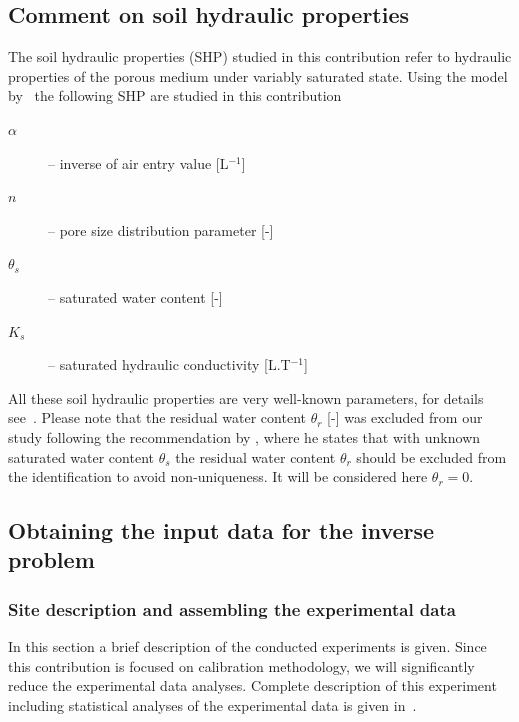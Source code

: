 \documentclass[review,times,3p,10pt]{elsarticle}
\begin{document}
{\subsection{Comment on soil hydraulic properties}
\label{shpdescr}

 The soil hydraulic properties (SHP) studied in this contribution refer to hydraulic properties of the porous medium under variably saturated state. Using the model by~\cite{vangenuchten} the following SHP are studied in this contribution
\begin{description}
\item[$\alpha$] -- inverse of air entry value [L$^{-1}$]
\item[$n$] -- pore size distribution parameter [-]
\item[$\theta_s$] -- saturated water content [-]
\item[$K_s$] -- saturated hydraulic conductivity [L.T$^{-1}$]
\end{description}
All these soil hydraulic properties are very well-known parameters, for details see~\citep{vangenuchten}. Please note that the residual water content $\theta_r$ [-] was excluded from our study following the recommendation by \cite{mous1993}, where he states that with unknown saturated water content $\theta_s$ the residual water content $\theta_r$ should be excluded from the identification to avoid non-uniqueness. It will be considered here $\theta_r=0$.




\subsection{Obtaining the input data for the inverse problem}
\label{assamb}



\subsubsection{Site description and assembling the experimental data}%
\label{site}

\label{povodi}

{In this section a brief description of the conducted experiments is given. Since this contribution is focused on calibration methodology, we will significantly reduce the experimental data analyses. Complete description of this experiment including statistical analyses of the experimental data is given in~\citep{jacka-site}.
}


}
\end{document}
